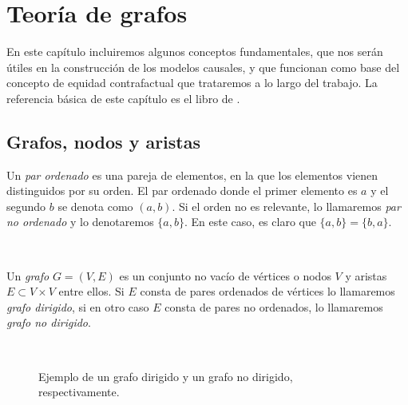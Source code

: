 \documentclass[oneside,openright,titlepage,numbers=noenddot,openany,headinclude,footinclude=true,
cleardoublepage=empty,abstractoff,BCOR=5mm,paper=a4,fontsize=12pt,main=spanish]{scrreprt}
\begin{document}
\chapter{Teoría de grafos} \label{ch:teorgraf}

En este capítulo incluiremos algunos conceptos fundamentales, que nos serán útiles en la construcción de los modelos causales, y que funcionan como base del concepto de equidad contrafactual que trataremos a lo largo del trabajo. La referencia básica de este capítulo es el libro de \cite{graphtheory2001}.

\section{Grafos, nodos y aristas}

\begin{definition}
Un \textit{par ordenado} es una pareja de elementos, en la que los elementos vienen distinguidos por su orden. El par ordenado donde el primer elemento es $a$ y el segundo $b$ se denota como $(a,b)$. Si el orden no es relevante, lo llamaremos \textit{par no ordenado} y lo denotaremos $\{a,b\}$. En este caso, es claro que $\{a,b\}=\{b,a\}$.
\end{definition}\

\begin{definition}[Grafo]
Un \textit{grafo} $G = (V,E)$ es un conjunto no vacío de vértices o nodos $V$ y aristas $E \subset V\times V$ entre ellos.
Si $E$ consta de pares ordenados de vértices lo llamaremos \textit{grafo dirigido}, si en otro caso $E$ consta de pares no ordenados, lo llamaremos \textit{grafo no dirigido}.
\end{definition}\

\begin{figure}[h]
\centering
{}
\caption{Ejemplo de un grafo dirigido y un grafo no dirigido, respectivamente.}
\label{fig:dirungraphs}
\end{figure}\
\end{document}
